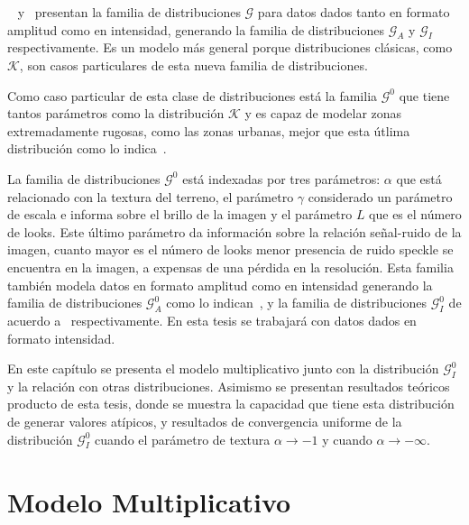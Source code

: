 ~\citet{Frery97} y~\citet{Frery99} presentan la familia de distribuciones $\mathcal{G}$ para datos dados tanto en formato amplitud como en intensidad, generando la familia de distribuciones $\mathcal{G}_A$ y $\mathcal{G}_I$ respectivamente. Es un modelo más general porque distribuciones clásicas, como $\mathcal{K}$, son casos particulares de esta nueva familia de distribuciones.

Como caso particular de esta clase de distribuciones está la familia $\mathcal{G}^0$ que tiene tantos parámetros como la distribución $\mathcal{K}$ y es capaz de modelar zonas extremadamente rugosas, como las zonas urbanas, mejor que esta útlima distribución como lo indica~\citet{Mejail99}. 

La familia de distribuciones $\mathcal{G}^0$ está indexadas por tres parámetros: $\alpha$ que está relacionado con la textura del terreno, el parámetro $\gamma$ considerado un parámetro de escala e informa sobre el brillo de la imagen y el parámetro $L$ que es el número de looks. Este último parámetro da información sobre la relación señal-ruido de la imagen, cuanto mayor es el número de looks menor presencia de ruido speckle se encuentra en la imagen, a expensas de una pérdida en la resolución. Esta familia también modela datos en formato amplitud como en intensidad generando la familia de distribuciones $\mathcal{G}_A^0$ como lo indican~\citet{Frery97}, y la familia de distribuciones $\mathcal{G}_I^0$ de acuerdo a~\citet{Frery97,Frery99} respectivamente. En esta tesis se trabajará con datos dados en formato intensidad.

En este capítulo se presenta el modelo multiplicativo junto con la distribución $\mathcal{G}_I^0$ y la relación con otras distribuciones. Asimismo se presentan resultados teóricos producto de esta tesis, donde se muestra la capacidad que tiene esta distribución de generar valores atípicos, y resultados de convergencia uniforme de la distribución $\mathcal{G}_I^0$ cuando el parámetro de textura $\alpha \longrightarrow -1$ y cuando $\alpha \longrightarrow -\infty$.


\section{Modelo Multiplicativo}
\label{ModeloMultiplicativo}


